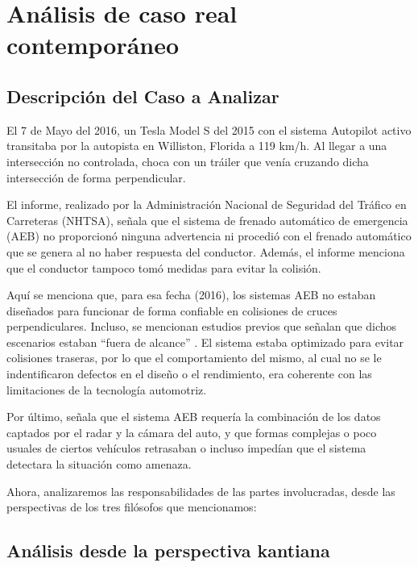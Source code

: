 \section{Análisis de caso real contemporáneo}
\subsection{Descripción del Caso a Analizar}

El 7 de Mayo del 2016, un Tesla Model S del 2015 con el sistema Autopilot activo transitaba por la autopista en Williston, Florida a 119 km/h. Al llegar a una intersección no controlada, choca con un tráiler que venía cruzando dicha intersección de forma perpendicular.

\medskip

El informe, realizado por la Administración Nacional de Seguridad del Tráfico en Carreteras (NHTSA), señala que el sistema de frenado automático de emergencia (AEB) no proporcionó ninguna advertencia ni procedió con el frenado automático que se genera al no haber respuesta del conductor. Además, el informe menciona que el conductor tampoco tomó medidas para evitar la colisión.

Aquí se menciona que, para esa fecha (2016), los sistemas AEB no estaban diseñados para funcionar de forma confiable en colisiones de cruces perpendiculares. Incluso, se mencionan estudios previos que señalan que dichos escenarios estaban “fuera de alcance” \citep{nhtsa2017pe16007}. El sistema estaba optimizado para evitar colisiones traseras, por lo que el comportamiento del mismo, al cual no se le indentificaron defectos en el diseño o el rendimiento, era coherente con las limitaciones de la tecnología automotriz.

\medskip

Por último, señala que el sistema AEB requería la combinación de los datos captados por el radar y la cámara del auto, y que formas complejas o poco usuales de ciertos vehículos retrasaban o incluso impedían que el sistema detectara la situación como amenaza.

Ahora, analizaremos las responsabilidades de las partes involucradas, desde las perspectivas de los tres filósofos que mencionamos: 

\subsection{Análisis desde la perspectiva kantiana}

